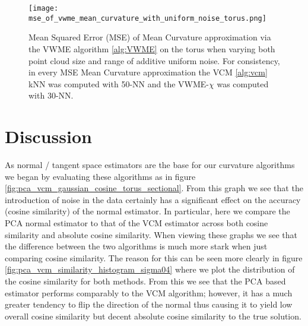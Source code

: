 \documentclass{article}
\begin{document}
\begin{figure}
    \centering
    \texttt{[image: mse\_of\_vwme\_mean\_curvature\_with\_uniform\_noise\_torus.png]}
    \caption{Mean Squared Error (MSE) of Mean Curvature approximation via the VWME algorithm \eqref{alg:VWME} on the torus when varying both point cloud size and range of additive uniform noise. For consistency, in every MSE Mean Curvature approximation the VCM \eqref{alg:vcm} kNN was computed with 50-NN and the VWME-$\chi$ was computed with 30-NN.}
    \label{fig:mse_vwme_mcurv_uniform_torus}
\end{figure}


\section{Discussion}
As normal / tangent space estimators are the base for our curvature algorithms we began by evaluating these algorithms as in figure \ref{fig:pca_vcm_gaussian_cosine_torus_sectional}. From this graph we see that the introduction of noise in the data certainly has a significant effect on the accuracy (cosine similarity) of the normal estimator. In particular, here we compare the PCA normal estimator to that of the VCM estimator across both cosine similarity and absolute cosine similarity. When viewing these graphs we see that the difference between the two algorithms is much more stark when just comparing cosine similarity. The reason for this can be seen more clearly in figure \ref{fig:pca_vcm_similarity_histogram_sigma04} where we plot the distribution of the cosine similarity for both methods. From this we see that the PCA based estimator performs comparably to the VCM algorithm; however, it has a much greater tendency to flip the direction of the normal thus causing it to yield low overall cosine similarity but decent absolute cosine similarity to the true solution.        
\end{document}
